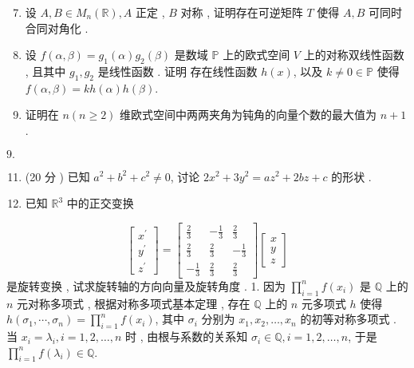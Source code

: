 \documentclass[10pt]{article}
\begin{document}
\begin{enumerate}
  \setcounter{enumi}{6}
  \item  设  $A, B \in M_{n}(\mathbb{R}), A$  正定 , $B$  对称 ,  证明存在可逆矩阵  $T$  使得  $A, B$  可同时合同对角化 .

  \item  设  $f(\alpha, \beta)=g_{1}(\alpha) g_{2}(\beta)$  是数域  $\mathbb{P}$  上的欧式空间  $V$  上的对称双线性函数 ,  且其中  $g_{1}, g_{2}$  是线性函数 .  证明   存在线性函数  $h(x)$,  以及  $k \neq 0 \in \mathbb{P}$  使得  $f(\alpha, \beta)=k h(\alpha) h(\beta)$.

  \item  证明在  $n(n \geqslant 2)$  维欧式空间中两两夹角为钝角的向量个数的最大值为  $n+1$.

\end{enumerate}
$9 .$

\begin{enumerate}
  \setcounter{enumi}{10}
  \item (20  分 )  已知  $a^{2}+b^{2}+c^{2} \neq 0$,  讨论  $2 x^{2}+3 y^{2}=a z^{2}+2 b z+c$  的形状 .

  \item  已知  $\mathbb{R}^{3}$  中的正交变换 

\end{enumerate}
$$
\left[\begin{array}{l}
x^{\prime} \\
y^{\prime} \\
z^{\prime}
\end{array}\right]=\left[\begin{array}{rrr}
\frac{2}{3} & -\frac{1}{3} & \frac{2}{3} \\
\frac{2}{3} & \frac{2}{3} & -\frac{1}{3} \\
-\frac{1}{3} & \frac{2}{3} & \frac{2}{3}
\end{array}\right]\left[\begin{array}{l}
x \\
y \\
z
\end{array}\right]
$$
 是旋转变换 ,  试求旋转轴的方向向量及旋转角度 . 1.  因为  $\prod_{i=1}^{n} f\left(x_{i}\right)$  是  $\mathbb{Q}$  上的  $n$  元对称多项式 ,  根据对称多项式基本定理 ,  存在  $\mathbb{Q}$  上的  $n$  元多项式  $h$  使得  $h\left(\sigma_{1}, \cdots, \sigma_{n}\right)=\prod_{i=1}^{n} f\left(x_{i}\right)$,  其中  $\sigma_{i}$  分别为  $x_{1}, x_{2}, \ldots, x_{n}$  的初等对称多项式 .  当  $x_{i}=\lambda_{i}, i=1,2, \ldots, n$  时 ,  由根与系数的关系知  $\sigma_{i} \in \mathbb{Q}, i=1,2, \ldots, n$,  于是  $\prod_{i=1}^{n} f\left(\lambda_{i}\right) \in \mathbb{Q}$.
\end{document}
